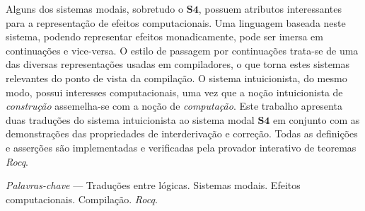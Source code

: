 \begin{titlepage}
{}

Alguns dos sistemas modais, sobretudo o $\mathbf{S4}$, possuem atributos interessantes para a representação de efeitos computacionais.
Uma linguagem baseada neste sistema, podendo representar efeitos monadicamente, pode ser imersa em continuações e vice-versa.
O estilo de passagem por continuações trata-se de uma das diversas representações usadas em compiladores, o que torna estes sistemas relevantes do ponto de vista da compilação.
O sistema intuicionista, do mesmo modo, possui interesses computacionais, uma vez que a noção intuicionista de \emph{construção} assemelha-se com a noção de \emph{computação}.
Este trabalho apresenta duas traduções do sistema intuicionista ao sistema modal $\mathbf{S4}$ em conjunto com as demonstrações das propriedades de interderivação e correção.
Todas as definições e asserções são implementadas e verificadas pela provador interativo de teoremas \emph{Rocq}.

\vspace{.5\baselineskip}
\textit{Palavras-chave} --- Traduções entre lógicas. Sistemas modais. Efeitos computacionais. Compilação. \emph{Rocq}.
\end{titlepage}